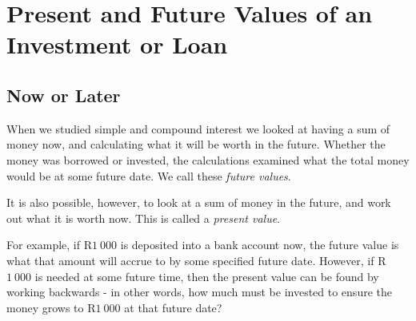 
\section{Present and Future Values of an Investment or Loan}
\label{sec:m:f11:presentfuture}

\subsection{Now or Later}
When we studied simple and compound interest we looked at having a sum of money now, and calculating what it will be worth in the future. Whether the money was borrowed or invested, the calculations examined what the total money would be at some future date. We call these \textit{future values}.

It is also possible, however, to look at a sum of money in the future, and work out what it is worth now. This is called a \textit{present value}.

For example, if R$1~000$ is deposited into a bank account now, the future value is what that amount will accrue to by some specified future date. However, if R$1~000$ is needed at some future time, then the present value can be found by working backwards - in other words, how much must be invested to ensure the money grows to R$1~000$ at that future date?

